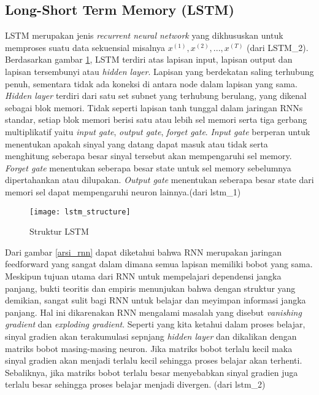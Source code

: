 \documentclass[../thesis.tex]{subfiles}
\begin{document}
\subsection{Long-Short Term Memory (LSTM)}
LSTM merupakan jenis \textit{recurrent neural network} yang dikhususkan untuk memproses suatu data sekuensial misalnya $x^{(1)}, x^{(2)}, ...,x^{(T)}$ (dari LSTM_2). 
Berdasarkan gambar \ref{arsi_lstm}, LSTM terdiri atas lapisan input, lapisan output dan lapisan tersembunyi atau \textit{hidden layer}. Lapisan yang berdekatan saling terhubung penuh, sementara tidak ada koneksi di antara node dalam lapisan yang sama.
\textit{Hidden layer} terdiri dari satu set subnet yang terhubung berulang, yang dikenal sebagai blok memori. Tidak seperti lapisan tanh tunggal dalam jaringan RNNs standar, setiap blok memori berisi satu atau lebih sel memori serta tiga gerbang multiplikatif
yaitu \textit{input gate}, \textit{output gate}, \textit{forget gate}. \textit{Input gate} berperan untuk menentukan apakah sinyal yang datang dapat masuk atau tidak serta menghitung seberapa besar sinyal tersebut akan mempengaruhi sel memory.
\textit{Forget gate} menentukan seberapa besar state untuk sel memory sebelumnya dipertahankan atau dilupakan. \textit{Output gate} menentukan seberapa besar state dari memori sel dapat mempengaruhi neuron lainnya.(dari lstm_1)

\begin{figure}
	\centering
	\texttt{[image: lstm\_structure]}
	\caption{Struktur LSTM}
	\label{arsi_lstm}
\end{figure}

Dari gambar \ref{arsi_rnn} dapat diketahui bahwa RNN merupakan jaringan feedforward yang sangat dalam dimana semua lapisan memiliki bobot yang sama. Meskipun tujuan utama dari RNN untuk mempelajari dependensi 
jangka panjang, bukti teoritis dan empiris menunjukan bahwa dengan struktur yang demikian, sangat sulit bagi RNN untuk belajar dan meyimpan informasi jangka panjang. Hal ini dikarenakan RNN mengalami masalah yang disebut 
\textit{vanishing gradient} dan \textit{exploding gradient}. Seperti yang kita ketahui dalam proses belajar, sinyal gradien akan terakumulasi sepnjang \textit{hidden layer} dan dikalikan dengan matriks bobot masing-masing neuron.
Jika matriks bobot terlalu kecil maka sinyal gradien akan menjadi terlalu kecil sehingga proses belajar akan terhenti. Sebaliknya, jika matriks bobot terlalu besar menyebabkan sinyal gradien juga terlalu besar sehingga proses belajar menjadi divergen. (dari lstm_2)
\end{document}
